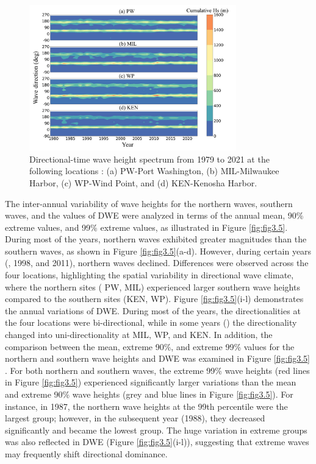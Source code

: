 \begin{figure}[htbp]
  \centering
  \includegraphics[width=0.8\textwidth]{chapter3/resources/figure3-4.jpg}
  \caption{Directional-time wave height spectrum from 1979 to 2021 at the following locations : (a) PW-Port Washington, (b) MIL-Milwaukee Harbor, (c) WP-Wind Point, and (d) KEN-Kenosha Harbor.}
  \label{fig:fig3.4}
\end{figure}

The inter-annual variability of wave heights for the northern waves, southern
waves, and the values of DWE were analyzed in terms of the annual mean, 90\%
extreme values, and 99\% extreme values, as illustrated in Figure
\ref{fig:fig3.5}. During most of the years, northern waves exhibited greater
magnitudes than the southern waves, as shown in Figure \ref{fig:fig3.5}(a-d).
However, during certain years (, 1998, and 2011), northern waves
declined. Differences were observed across the four locations, highlighting the
spatial variability in directional wave climate, where the northern sites (\eg
PW, MIL) experienced larger southern wave heights compared to the southern sites
(\eg KEN, WP). Figure \ref{fig:fig3.5}(i-l) demonstrates the annual variations
of DWE. During most of the years, the directionalities at the four locations
were bi-directional, while in some years () the directionality changed
into uni-directionality at MIL, WP, and KEN. In addition, the comparison between
the mean, extreme 90\%, and extreme 99\% values for the northern and southern
wave heights and DWE was examined in Figure \ref{fig:fig3.5} . For both northern
and southern waves, the extreme 99\% wave heights (red lines in Figure
\ref{fig:fig3.5}) experienced significantly larger variations than the mean and
extreme 90\% wave heights (grey and blue lines in Figure \ref{fig:fig3.5}). For
instance, in 1987, the northern wave heights at the 99th percentile were the
largest group; however, in the subsequent year (1988), they decreased
significantly and became the lowest group. The huge variation in extreme groups
was also reflected in DWE (Figure \ref{fig:fig3.5}(i-l)), suggesting that
extreme waves may frequently shift directional dominance.

